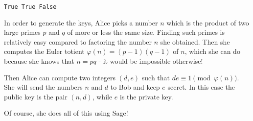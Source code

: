\documentclass[11pt]{article}
\begin{document}
    \begin{Verbatim}[commandchars=\\\{\}]
True True False
    \end{Verbatim}

    In order to generate the keys, Alice picks a number \(n\) which is the
product of two large primes \(p\) and \(q\) of more or less the same
size. Finding such primes is relatively easy compared to factoring the
number \(n\) she obtained. Then she computes the Euler totient
\(\varphi(n)=(p-1)(q-1)\) of \(n\), which she can do because she knows
that \(n=pq\) - it would be impossible otherwise!

Then Alice can compute two integers \((d,e)\) such that
\(de\equiv 1\pmod{\varphi(n)}\). She will send the numbers \(n\) and
\(d\) to Bob and keep \(e\) secret. In this case the public key is the
pair \((n,d)\), while \(e\) is the private key.

Of course, she does all of this using Sage!
\end{document}
